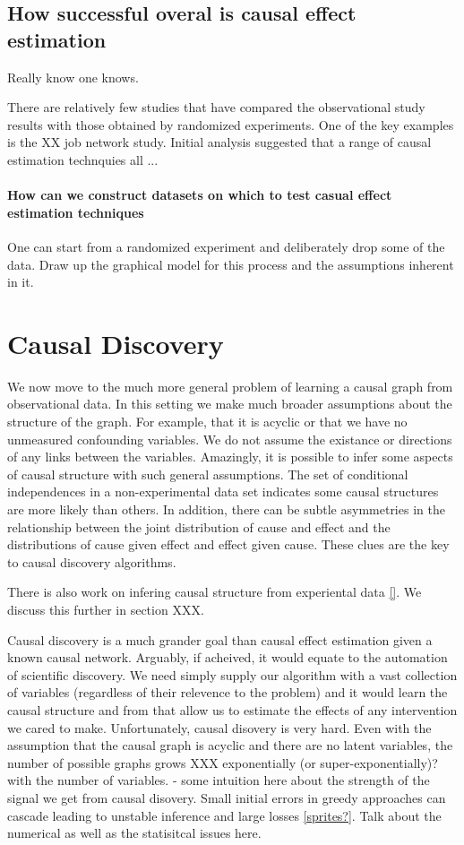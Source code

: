 \documentclass[11pt,a4paper,oneside]{book}
\begin{document}
\subsection*{How successful overal is causal effect estimation}
Really know one knows.

There are relatively few studies that have compared the observational study results with those obtained by randomized experiments. One of the key examples is the XX job network study. Initial analysis suggested that a range of causal estimation technquies all ...

\paragraph*{How can we construct datasets on which to test casual effect estimation techniques}
One can start from a randomized experiment and deliberately drop some of the data. Draw up the graphical model for this process and the assumptions inherent in it. 

\section*{Causal Discovery}
We now move to the much more general problem of learning a causal graph from observational data. In this setting we make much broader assumptions about the structure of the graph. For example, that it is acyclic or that we have no unmeasured confounding variables. We do not assume the existance or directions of any links between the variables. Amazingly, it is possible to infer some aspects of causal structure with such general assumptions. The set of conditional independences in a non-experimental data set indicates some causal structures are more likely than others. In addition, there can be subtle asymmetries in the relationship between the joint distribution of cause and effect and the distributions of cause given effect and effect given cause. These clues are the key to causal discovery algorithms.

There is also work on infering causal structure from experiental data \ref{}. We discuss this further in section XXX.

Causal discovery is a much grander goal than causal effect estimation given a known causal network. Arguably, if acheived, it would equate to the automation of scientific discovery. We need simply supply our algorithm with a vast collection of variables (regardless of their relevence to the problem) and it would learn the causal structure and from that allow us to estimate the effects of any intervention we cared to make. Unfortunately, causal disovery is very hard. Even with the assumption that the causal graph is acyclic and there are no latent variables, the number of possible graphs grows XXX exponentially (or super-exponentially)? with the number of variables. - some intuition here about the strength of the signal we get from causal disovery. Small initial errors in greedy approaches can cascade leading to unstable inference and large losses \ref{sprites?}. Talk about the numerical as well as the statisitcal issues here. 
\end{document}
